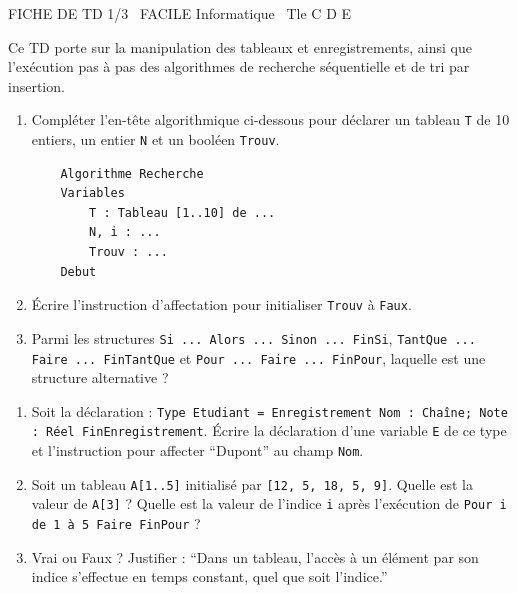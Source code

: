 \documentclass[11pt]{article}
\begin{document}
\begin{tcolorbox}[enhanced,colback=popink,colframe=popink,arc=10pt,boxrule=0pt,left=12pt,right=12pt,top=9pt,bottom=9pt]
{\color{white}\popxbold\small FICHE DE TD 1/3 \textbullet\ FACILE \hfill Informatique \textbullet\ Tle C D E\par}
\end{tcolorbox}
\vspace{4pt}
\noindent Ce TD porte sur la manipulation des tableaux et enregistrements, ainsi que l'exécution pas à pas des algorithmes de recherche séquentielle et de tri par insertion.

\begin{exercice}
\begin{enumerate}
    \item Compléter l'en-tête algorithmique ci-dessous pour déclarer un tableau \texttt{T} de 10 entiers, un entier \texttt{N} et un booléen \texttt{Trouv}.
    \begin{verbatim}
    Algorithme Recherche
    Variables
        T : Tableau [1..10] de ...
        N, i : ...
        Trouv : ...
    Debut
    \end{verbatim}
    \item Écrire l'instruction d'affectation pour initialiser \texttt{Trouv} à \texttt{Faux}.
    \item Parmi les structures \texttt{Si ... Alors ... Sinon ... FinSi}, \texttt{TantQue ... Faire ... FinTantQue} et \texttt{Pour ... Faire ... FinPour}, laquelle est une structure alternative ?
\end{enumerate}
\end{exercice}

\begin{exercice}
\begin{enumerate}
    \item Soit la déclaration : \texttt{Type Etudiant = Enregistrement Nom : Chaîne; Note : Réel FinEnregistrement}. Écrire la déclaration d'une variable \texttt{E} de ce type et l'instruction pour affecter ``Dupont'' au champ \texttt{Nom}.
    \item Soit un tableau \texttt{A[1..5]} initialisé par \texttt{[12, 5, 18, 5, 9]}. Quelle est la valeur de \texttt{A[3]} ? Quelle est la valeur de l'indice \texttt{i} après l'exécution de \texttt{Pour i de 1 à 5 Faire FinPour} ?
    \item Vrai ou Faux ? Justifier : ``Dans un tableau, l'accès à un élément par son indice s'effectue en temps constant, quel que soit l'indice.''
\end{enumerate}
\end{exercice}
\end{document}
